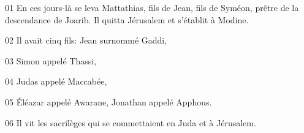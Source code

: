 01 En ces jours-là se leva Mattathias, fils de Jean, fils de Syméon, prêtre de la descendance de Joarib. Il quitta Jérusalem et s’établit à Modine.

02 Il avait cinq fils: Jean surnommé Gaddi,

03 Simon appelé Thassi,

04 Judas appelé Maccabée,

05 Éléazar appelé Awarane, Jonathan appelé Apphous.

06 Il vit les sacrilèges qui se commettaient en Juda et à Jérusalem.
